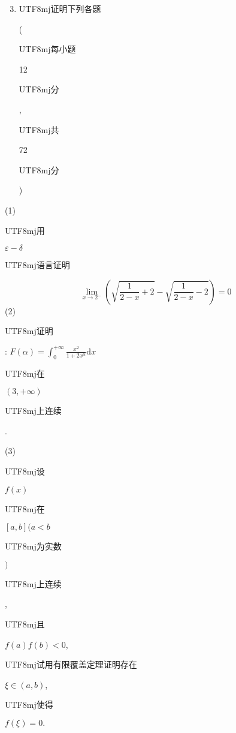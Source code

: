 \documentclass[10pt]{article}
\begin{document}
\begin{enumerate}
  \setcounter{enumi}{2}
  \item \begin{CJK}{UTF8}{mj}证明下列各题\end{CJK} (\begin{CJK}{UTF8}{mj}每小题\end{CJK} 12 \begin{CJK}{UTF8}{mj}分\end{CJK}, \begin{CJK}{UTF8}{mj}共\end{CJK} 72 \begin{CJK}{UTF8}{mj}分\end{CJK})
\end{enumerate}
(1) \begin{CJK}{UTF8}{mj}用\end{CJK} $\varepsilon-\delta$ \begin{CJK}{UTF8}{mj}语言证明\end{CJK}
$$
\lim _{x \rightarrow 2^{-}}\left(\sqrt{\frac{1}{2-x}+2}-\sqrt{\frac{1}{2-x}-2}\right)=0
$$
(2) \begin{CJK}{UTF8}{mj}证明\end{CJK}: $F(\alpha)=\int_{0}^{+\infty} \frac{x^{2}}{1+2 x^{\alpha}} \mathrm{d} x$ \begin{CJK}{UTF8}{mj}在\end{CJK} $(3,+\infty)$ \begin{CJK}{UTF8}{mj}上连续\end{CJK}.

(3) \begin{CJK}{UTF8}{mj}设\end{CJK} $f(x)$ \begin{CJK}{UTF8}{mj}在\end{CJK} $[a, b](a<b$ \begin{CJK}{UTF8}{mj}为实数\end{CJK} $)$ \begin{CJK}{UTF8}{mj}上连续\end{CJK}, \begin{CJK}{UTF8}{mj}且\end{CJK} $f(a) f(b)<0$, \begin{CJK}{UTF8}{mj}试用有限覆盖定理证明存在\end{CJK} $\xi \in(a, b)$, \begin{CJK}{UTF8}{mj}使得\end{CJK} $f(\xi)=0 .$
\end{document}
